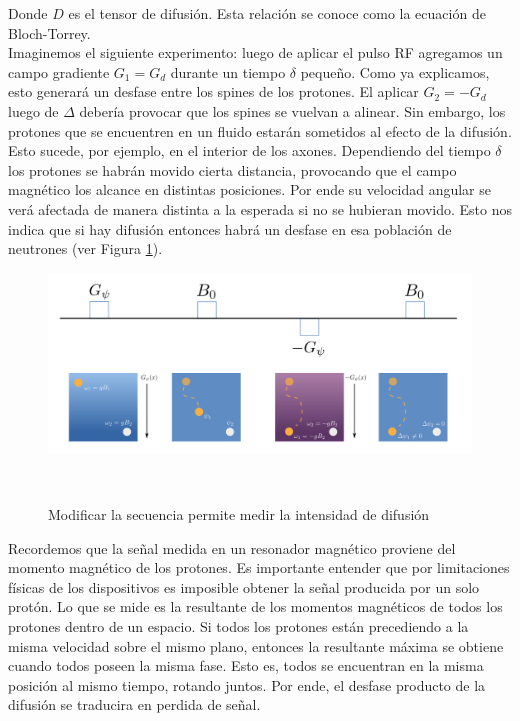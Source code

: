 Donde $D$ es el tensor de difusi\'on. Esta relaci\'on se conoce como la
ecuaci\'on de Bloch-Torrey.\\

Imaginemos el siguiente experimento: luego de aplicar el pulso RF agregamos un
campo gradiente $G_1=G_d$ durante un tiempo $\delta$ peque\~no. Como ya explicamos,
esto generar\'a un desfase entre los spines de los protones. El aplicar $G_2=-G_d$
luego de $\Delta$ deber\'ia provocar que los spines se vuelvan a alinear. Sin
embargo, los protones que se encuentren en un fluido estar\'an sometidos al
efecto de la difusi\'on. Esto sucede, por ejemplo, en el interior de los
axones. Dependiendo del tiempo $\delta$ los protones se habr\'an movido cierta
distancia, provocando que el campo magn\'etico los alcance en distintas 
posiciones. Por ende su velocidad angular se ver\'a afectada de manera distinta 
a la esperada si no se hubieran movido. Esto nos indica que si hay difusi\'on
entonces habr\'a un desfase en esa poblaci\'on de neutrones (ver Figura 
\ref{fig:dmri}).\\

\begin{figure}
                                                                                                                        
\begin{minipage}[b]{\textwidth}
    \includegraphics[width=\textwidth]{img/dmri.png}
    \caption{Modificar la secuencia permite medir la intensidad de difusi\'on}
    \label{fig:dmri}
\end{minipage} ~

\end{figure}  

Recordemos que la se\~nal medida en un resonador magn\'etico proviene del 
momento magn\'etico de los protones. Es importante entender que por limitaciones
f\'isicas de los dispositivos es imposible obtener la se\~nal producida por un
solo prot\'on. Lo que se mide es la resultante de los momentos magn\'eticos de 
todos los protones dentro de un espacio. Si todos los protones est\'an precediendo
a la misma velocidad sobre el mismo plano, entonces la resultante m\'axima se
obtiene cuando todos poseen la misma fase. Esto es, todos se encuentran en la
misma posici\'on al mismo tiempo, rotando juntos. Por ende, el desfase producto
de la difusi\'on se traducira en perdida de se\~nal.\\


